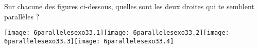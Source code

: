 Sur chacune des figures ci-dessous, quelles sont les deux droites qui
te semblent parallèles ?
\par\texttt{[image: 6parallelesexo33.1]}\hfill\texttt{[image: 6parallelesexo33.2]}\hfill\texttt{[image: 6parallelesexo33.3]}\hfill\texttt{[image: 6parallelesexo33.4]}
